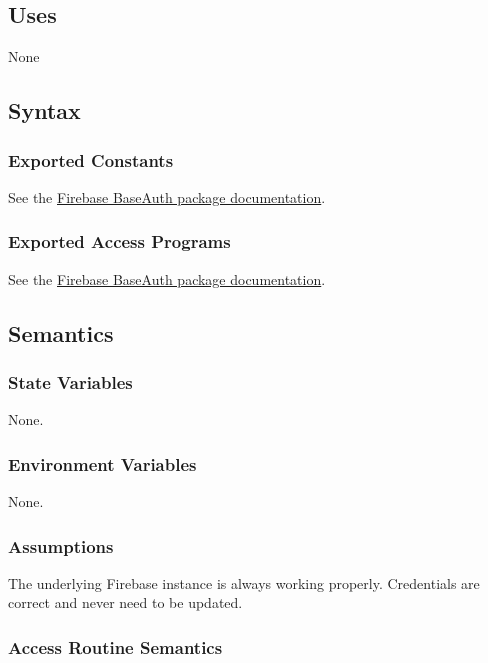 \documentclass[12pt, titlepage]{article}
\begin{document}
\subsection{Uses}

None

\subsection{Syntax}

\subsubsection{Exported Constants}

See the \href{https://firebase.google.com/docs/reference/admin/node/firebase-admin.auth.baseauth.md#baseauth_class}{Firebase BaseAuth package documentation}. 

\subsubsection{Exported Access Programs}

See the \href{https://firebase.google.com/docs/reference/admin/node/firebase-admin.auth.baseauth.md#baseauth_class}{Firebase BaseAuth package documentation}.

\subsection{Semantics}

\subsubsection{State Variables}

None.

\subsubsection{Environment Variables}

None.

\subsubsection{Assumptions}

The underlying Firebase instance is always working properly. Credentials are correct and never need to be updated.

\subsubsection{Access Routine Semantics}
\end{document}
